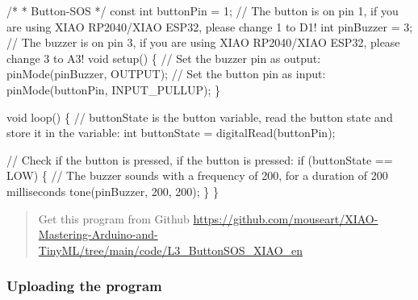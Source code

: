 \documentclass[
  letterpaper,
  DIV=11,
  numbers=noendperiod]{scrreprt}
\newenvironment{Shaded}{\begin{snugshade}}{\end{snugshade}}
\newcommand{\AttributeTok}[1]{\textcolor[rgb]{0.40,0.45,0.13}{#1}}
\newcommand{\CommentTok}[1]{\textcolor[rgb]{0.37,0.37,0.37}{#1}}
\newcommand{\ControlFlowTok}[1]{\textcolor[rgb]{0.00,0.23,0.31}{#1}}
\newcommand{\DataTypeTok}[1]{\textcolor[rgb]{0.68,0.00,0.00}{#1}}
\newcommand{\DecValTok}[1]{\textcolor[rgb]{0.68,0.00,0.00}{#1}}
\newcommand{\NormalTok}[1]{\textcolor[rgb]{0.00,0.23,0.31}{#1}}
\newcommand{\OperatorTok}[1]{\textcolor[rgb]{0.37,0.37,0.37}{#1}}
\begin{document}
\begin{Shaded}
\begin{Highlighting}[]
\CommentTok{/*}
\CommentTok{ * Button{-}SOS}
\CommentTok{ */}
\AttributeTok{const} \DataTypeTok{int}\NormalTok{ buttonPin }\OperatorTok{=} \DecValTok{1}\OperatorTok{;} \CommentTok{// The button is on pin 1, if you are using XIAO RP2040/XIAO ESP32, please change 1 to D1!}
\DataTypeTok{int}\NormalTok{ pinBuzzer }\OperatorTok{=} \DecValTok{3}\OperatorTok{;} \CommentTok{// The buzzer is on pin 3, if you are using XIAO RP2040/XIAO ESP32, please change 3 to A3!}
\DataTypeTok{void}\NormalTok{ setup}\OperatorTok{()} \OperatorTok{\{}
  \CommentTok{// Set the buzzer pin as output:}
\NormalTok{  pinMode}\OperatorTok{(}\NormalTok{pinBuzzer}\OperatorTok{,}\NormalTok{ OUTPUT}\OperatorTok{);}
  \CommentTok{// Set the button pin as input:}
\NormalTok{  pinMode}\OperatorTok{(}\NormalTok{buttonPin}\OperatorTok{,}\NormalTok{ INPUT\_PULLUP}\OperatorTok{);}
\OperatorTok{\}}
 
\DataTypeTok{void}\NormalTok{ loop}\OperatorTok{()} \OperatorTok{\{}
  \CommentTok{// buttonState is the button variable, read the button state and store it in the variable:}
  \DataTypeTok{int}\NormalTok{ buttonState }\OperatorTok{=}\NormalTok{ digitalRead}\OperatorTok{(}\NormalTok{buttonPin}\OperatorTok{);}
 
  \CommentTok{// Check if the button is pressed, if the button is pressed:}
  \ControlFlowTok{if} \OperatorTok{(}\NormalTok{buttonState }\OperatorTok{==}\NormalTok{ LOW}\OperatorTok{)} \OperatorTok{\{}
    \CommentTok{// The buzzer sounds with a frequency of 200, for a duration of 200 milliseconds}
\NormalTok{    tone}\OperatorTok{(}\NormalTok{pinBuzzer}\OperatorTok{,} \DecValTok{200}\OperatorTok{,} \DecValTok{200}\OperatorTok{);}
  \OperatorTok{\}}
\OperatorTok{\}}
\end{Highlighting}
\end{Shaded}

\begin{quote}
Get this program from Github
\url{https://github.com/mouseart/XIAO-Mastering-Arduino-and-TinyML/tree/main/code/L3_ButtonSOS_XIAO_en}
\end{quote}

\hypertarget{uploading-the-program-2}{%
\subsubsection*{Uploading the program}\label{uploading-the-program-2}}
\end{document}
